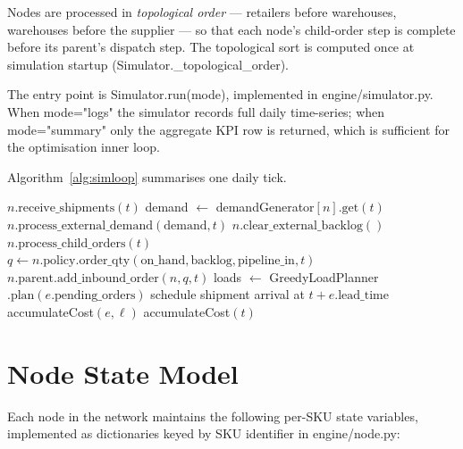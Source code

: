 Nodes are processed in \emph{topological order} — retailers before warehouses,
warehouses before the supplier — so that each node's child-order step is
complete before its parent's dispatch step.  The topological sort is computed
once at simulation startup (Simulator.\_topological\_order).

The entry point is Simulator.run(mode), implemented in
engine/simulator.py.  When mode="logs" the simulator records
full daily time-series; when mode="summary" only the aggregate KPI
row is returned, which is sufficient for the optimisation inner loop.

Algorithm~\ref{alg:simloop} summarises one daily tick.

\begin{algorithm}[h]
\caption{Daily simulation tick at time $t$}
\label{alg:simloop}
\begin{algorithmic}[1]
  \State $n.\text{receive\_shipments}(t)$
    \State demand $\leftarrow$ demandGenerator$[n].\text{get}(t)$
    \State $n.\text{process\_external\_demand}(\text{demand}, t)$
  \EndIf
  \State $n.\text{clear\_external\_backlog}()$ 
  \State $n.\text{process\_child\_orders}(t)$
\EndFor
{}
  \State $q \leftarrow n.\text{policy}.\text{order\_qty}(
         \text{on\_hand}, \text{backlog}, \text{pipeline\_in}, t)$
  \State $n.\text{parent}.\text{add\_inbound\_order}(n, q, t)$
\EndFor
{}
  \State loads $\leftarrow$ GreedyLoadPlanner$.\text{plan}(e.\text{pending\_orders})$
    \State schedule shipment arrival at $t + e.\text{lead\_time}$
    \State accumulateCost$(e, \ell)$
  \EndFor
\EndFor
\State accumulateCost$(t)$ 
\end{algorithmic}
\end{algorithm}

\section{Node State Model}
\label{sec:arch:node}

Each node in the network maintains the following per-SKU state variables,
implemented as dictionaries keyed by SKU identifier in engine/node.py:

